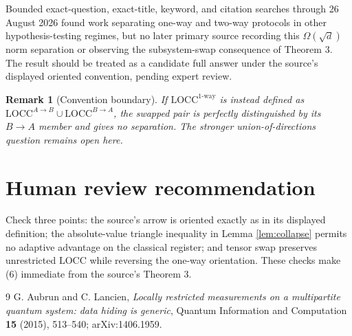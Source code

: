 \documentclass[11pt]{article}
\newtheorem{remark}{Remark}
\newcommand{\LOCC}{\mathrm{LOCC}}
\begin{document}
Bounded exact-question, exact-title, keyword, and citation searches through
26 August 2026 found work separating one-way and two-way protocols in other
hypothesis-testing regimes, but no later primary source recording this
$\Omega(\sqrt d)$ norm separation or observing the subsystem-swap consequence
of Theorem 3.  The result should be treated as a candidate full answer under
the source's displayed oriented convention, pending expert review.

\begin{remark}[Convention boundary]
If $\LOCC^{1\text{-way}}$ is instead defined as
$\LOCC^{A\to B}\cup\LOCC^{B\to A}$, the swapped pair is perfectly
distinguished by its $B\to A$ member and gives no separation.  The stronger
union-of-directions question remains open here.
\end{remark}

\section{\hspace{0.25em}Human review recommendation}

Check three points: the source's arrow is oriented exactly as in its displayed
definition; the absolute-value triangle inequality in Lemma
\ref{lem:collapse} permits no adaptive advantage on the classical register;
and tensor swap preserves unrestricted $\LOCC$ while reversing the one-way
orientation.  These checks make (6) immediate from the source's Theorem 3.

\begin{thebibliography}{9}
G. Aubrun and C. Lancien,
\emph{Locally restricted measurements on a multipartite quantum system:
data hiding is generic}, Quantum Information and Computation
\textbf{15} (2015), 513--540; arXiv:1406.1959.
\end{thebibliography}
\end{document}
